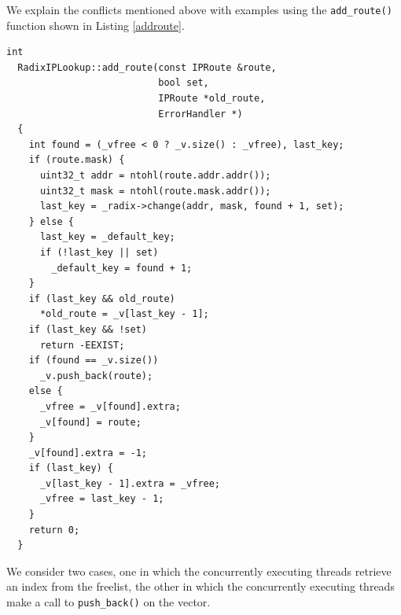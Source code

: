 \documentclass[a4paper,marginparwidth=50pt,marginparsep=10pt]{article}
\begin{document}
We explain the conflicts mentioned above with examples using the \verb+add_route()+ function shown in  Listing \ref{addroute}.
\begin{lstlisting}[caption = The add\_route function, label=addroute,float=tph]
  int
  RadixIPLookup::add_route(const IPRoute &route, 
                           bool set, 
                           IPRoute *old_route, 
                           ErrorHandler *)
  {
    int found = (_vfree < 0 ? _v.size() : _vfree), last_key;
    if (route.mask) {
      uint32_t addr = ntohl(route.addr.addr());
      uint32_t mask = ntohl(route.mask.addr());
      last_key = _radix->change(addr, mask, found + 1, set);
    } else {
      last_key = _default_key;
      if (!last_key || set)
        _default_key = found + 1;
    }
    if (last_key && old_route)
      *old_route = _v[last_key - 1];
    if (last_key && !set)
      return -EEXIST;
    if (found == _v.size())
      _v.push_back(route);
    else {
      _vfree = _v[found].extra;
      _v[found] = route;
    }
    _v[found].extra = -1;
    if (last_key) {
      _v[last_key - 1].extra = _vfree;
      _vfree = last_key - 1;
    }
    return 0;
  }
\end{lstlisting}
We consider two cases, one in which the concurrently executing threads retrieve an index from the freelist, the other in which the concurrently executing threads make a call to \verb+push_back()+ on the vector.\\
\end{document}
